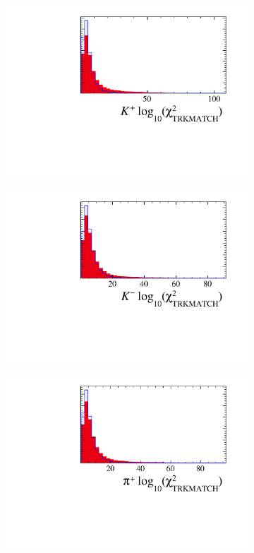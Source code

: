 \begin{figure}[!h]
\begin{subfigure}[t]{0.22\textwidth}
      \includegraphics[width=1.0\textwidth]{figs/Selection/Ds_BDT_Var_Ds2KKPi_D_K0_TRACK_MatchCHI2.pdf}
   \end{subfigure}
   \begin{subfigure}[t]{0.22\textwidth}
      \centering
      \includegraphics[width=1.0\textwidth]{figs/Selection/Ds_BDT_Var_Ds2KKPi_D_K1_TRACK_MatchCHI2.pdf}
   \end{subfigure}
   \begin{subfigure}[t]{0.22\textwidth}
      \centering
      \includegraphics[width=1.0\textwidth]{figs/Selection/Ds_BDT_Var_Ds2KKPi_D_P_TRACK_MatchCHI2.pdf}

\end{subfigure}
\end{figure}

